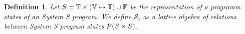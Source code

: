 \documentclass{article}
\newtheorem{definition}[theorem]{Definition}
\newcommand{\minus}{{\scalebox{0.9}{-}}}
\newcommand{\plus}{{\scalebox{0.6}{\!+}}}
\newcommand{\fail}{\ensuremath \uparrow}
\newcommand{\transform}[5]{#1, #2 \xrightarrow{#3} #4, #5}
\newcommand{\transformfail}[3]{#1, #2 \xrightarrow{#3}\ \fail}
\newcommand{\cjm}{\ensuremath \xmapsto{\text{\tiny cjm}}}
\newcommand{\Term}{\ensuremath \mathbb{T}}
\newcommand{\Fail}{\ensuremath \mathbb{F}}
\newcommand{\Var}{\ensuremath \mathbb{V}}
\newcommand{\Env}{\ensuremath \Var \mapsto \Term}
\newcommand{\Pow}[1]{\ensuremath \mathcal{P}(#1)}
\newcommand{\Fstrat}[1]{\ensuremath \normalfont\text{Fstrat}\llbracket #1 \rrbracket}
\newcommand{\Fstratm}[1]{\ensuremath \text{\normalfont Fstrat}_\minus \llbracket #1 \rrbracket}
\newcommand{\Fstratp}[1]{\ensuremath \text{\normalfont Fstrat}_\plus \llbracket #1 \rrbracket}
\newcommand{\Bstrat}[1]{\ensuremath \text{\normalfont Bstrat}\llbracket #1 \rrbracket}
\newcommand{\Bstratp}[1]{\ensuremath \text{\normalfont Bstrat}_\plus \llbracket #1 \rrbracket}
\newcommand{\Bstratm}[1]{\ensuremath \text{\normalfont Bstrat}_\minus \llbracket #1 \rrbracket}
\newcommand{\State}{\ensuremath \text{State}}
\newcommand{\Statef}{\ensuremath \text{State}_\fail}
\newcommand{\Statea}{\ensuremath \widehat{\text{State}}}
\newcommand{\Stateaf}{\ensuremath \widehat{\text{State}}_\fail}
\newcommand{\setbuild}[2]{\ensuremath \left\{\, #1 \mid #2 \,\right\}}
\begin{document}
\begin{definition}
  Let $S = \Term \times (\Env) \cup \Fail$ be the representation of a programm states of an System S program. We define $\mathcal{S}$, as a lattice algebra of relations between System S program states $\Pow{S \times S}$.
\end{definition}




\end{document}
